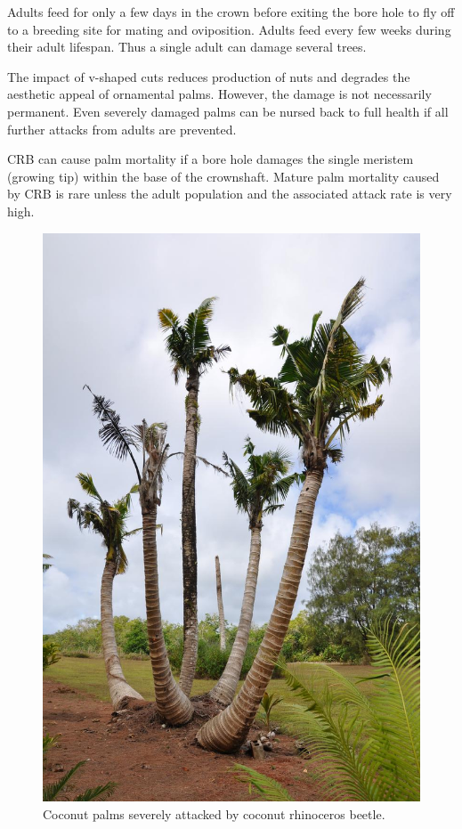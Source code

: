 \documentclass[twocolumn,letterpaper]{scrartcl}
\begin{document}
Adults feed for only a few days in the crown before exiting the bore hole to fly off to a breeding site for mating and oviposition. Adults feed every few weeks during their adult lifespan. Thus a single adult can damage several trees.

The impact of v-shaped cuts reduces production of nuts and degrades the aesthetic appeal of ornamental palms. However, the damage is not necessarily permanent. Even severely damaged palms can be nursed back to full health if all further attacks from adults are prevented.

CRB can cause palm mortality if a bore hole damages the single meristem (growing tip) within the base of the crownshaft. Mature palm mortality caused by CRB is rare unless the adult population and the associated attack rate is very high.   


\begin{figure}[h]
	\centering
	\includegraphics[width=0.8\linewidth]{images/dying_coconuts}
	\caption{Coconut palms severely attacked by coconut rhinoceros beetle.}
	\label{fig:dyingcoconuts}
\end{figure}
\end{document}
